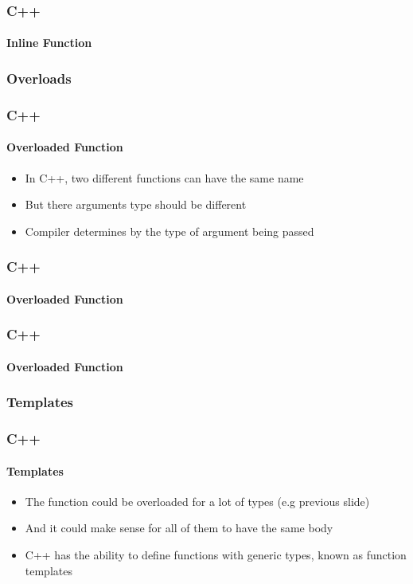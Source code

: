 \documentclass[hyperref={pdfpagelabels=true}]{beamer}
\begin{document}
\begin{frame}
\frametitle{C++}
\framesubtitle{Inline Function}
{\tiny }
\end{frame}

\subsubsection{Overloads}
\begin{frame}
\frametitle{C++}
\framesubtitle{Overloaded Function}
\begin{itemize}[<+->]
\item In C++, two different functions can have the same name
\item But there arguments type should be different
\item Compiler determines by the type of argument being passed
\end{itemize}
\end{frame}

\begin{frame}[shrink]
\frametitle{C++}
\framesubtitle{Overloaded Function}
\begin{tcolorbox}[title= ,width=9.85 cm]
\tiny

\end{tcolorbox}
\end{frame}


\begin{frame}[shrink]
\frametitle{C++}
\framesubtitle{Overloaded Function}
\begin{tcolorbox}[title= ,width=9.85 cm]
\tiny

\end{tcolorbox}
\end{frame}

\subsubsection{Templates}
\begin{frame}
\frametitle{C++}
\framesubtitle{Templates}
\begin{itemize}[<+->]
\item The function could be overloaded for a lot of types (e.g previous slide)
\item And it could make sense for all of them to have the same body
\item C++ has the ability to define functions with generic types, known as function templates
\end{itemize}
\pause
\begin{tcolorbox}[title= ,width=9.85 cm]

\end{tcolorbox}
\end{frame}
\end{document}
